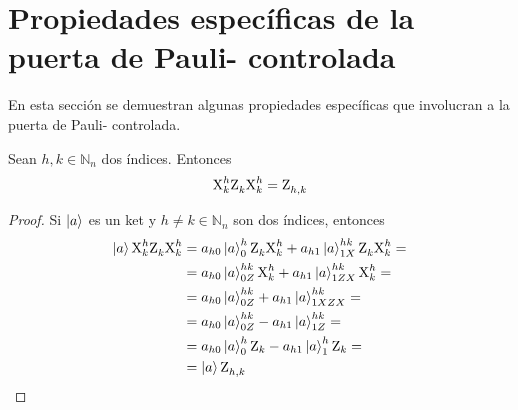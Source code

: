 \section{Propiedades específicas de la puerta de Pauli- controlada}
En esta sección se demuestran algunas propiedades específicas que involucran a la puerta de Pauli- controlada.

\begin{proposition}
  Sean $h,k \in \mathbb{N}_n$ dos índices.
  Entonces
  \begin{equation}
    \text{X}^{h}_{k}\text{Z}^{}_{k}\text{X}^{h}_{k} = \text{Z}^{}_{h,k}
  \end{equation}
\end{proposition}
\begin{proof}
  Si $\ket{a}$ es un ket y $h\neq k\in \mathbb{N}_n$ son dos índices, entonces
  \begin{align*}
    \ket{a}\text{X}^{h}_{k}\text{Z}^{}_{k}\text{X}^{h}_{k}
     & =a_{h0}\ket{a}^{h}_{0}\text{Z}^{}_{k}\text{X}^{h}_{k}+
    a_{h1}\ket{a}^{hk}_{1X}\text{Z}^{}_{k}\text{X}^{h}_{k}=                \\
     & =a_{h0}\ket{a}^{hk}_{0Z}\text{X}^{h}_{k}+
    a_{h1}\ket{a}^{hk}_{1ZX}\text{X}^{h}_{k}=                                 \\
     & =a_{h0}\ket{a}^{hk}_{0Z}+a_{h1}\ket{a}^{hk}_{1XZX}=               \\
     & =a_{h0}\ket{a}^{hk}_{0Z}-a_{h1}\ket{a}^{hk}_{1Z}=                 \\
     & =a_{h0}\ket{a}^{h}_{0}\text{Z}_k-a_{h1}\ket{a}^{h}_{1}\text{Z}_k= \\
     & =\ket{a}\text{Z}^{}_{h,k}
  \end{align*}
\end{proof}

